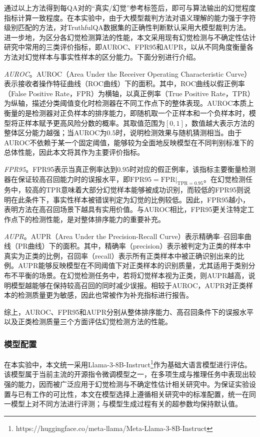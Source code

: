 通过以上方法得到每QA对的“真实/幻觉”参考标签后，即可与算法输出的幻觉程度指标计算一致程度。在本实验中，由于大模型裁判方法对语义理解的能力强于字符级别匹配的方法，对TruthfulQA数据集的正确性判断默认采用大模型裁判方法。进一步地，为区分各幻觉检测算法的性能，本文采用现有幻觉检测与不确定性估计研究中常用的三类评价指标，即AUROC、FPR95和AUPR，以从不同角度衡量各方法对幻觉样本与事实性样本的区分能力。下面分别进行介绍。

\emph{AUROC}。AUROC（Area Under the Receiver Operating Characteristic Curve）表示接收者操作特征曲线（ROC曲线）下的面积。其中，ROC曲线以假正例率（False Positive Rate，FPR）为横轴，以真正例率（True Positive Rate，TPR）为纵轴，描述分类阈值变化时检测器在不同工作点下的整体表现。AUROC本质上衡量的是检测器对正负样本的排序能力，即随机取一个正样本和一个负样本时，模型将正样本赋予更高风险分数的概率。其取值范围为$[0,1]$，数值越大表示方法的整体区分能力越强；当AUROC为$0.5$时，说明检测效果与随机猜测相当。由于AUROC不依赖于某一个固定阈值，能够较为全面地反映模型在不同判别标准下的总体性能，因此本文将其作为主要评价指标。

\emph{FPR95}。FPR95表示当真正例率达到$0.95$时对应的假正例率，该指标主要衡量检测器在保证较高召回能力时的误报水平，即$\mathrm{FPR95} = \mathrm{FPR}\big|_{\mathrm{TPR}=0.95}$。在幻觉检测任务中，较高的TPR意味着大部分幻觉样本能够被成功识别，而较低的FPR95则说明在此条件下，事实性样本被错误判定为幻觉的比例较低。因此，FPR95越小，表明方法在高召回场景下越具有实用价值。与AUROC相比，FPR95更关注特定工作点下的检测性能，是对整体排序能力的重要补充。

\emph{AUPR}。AUPR（Area Under the Precision-Recall Curve）表示精确率--召回率曲线（PR曲线）下的面积。其中，精确率（precision）表示被判定为正类的样本中真实为正类的比例，召回率（recall）表示所有正类样本中被正确识别出来的比例。AUPR能够反映模型在不同阈值下对正类样本的识别质量，尤其适用于类别分布不平衡的场景。在幻觉检测任务中，若将幻觉样本视为正类，则AUPR越高，说明模型越能够在保持较高召回的同时减少误报。相较于AUROC，AUPR对正类样本的检测质量更为敏感，因此也常被作为补充指标进行报告。

综上，AUROC、FPR95和AUPR分别从整体排序能力、高召回条件下的误报水平以及正类检测质量三个方面评估幻觉检测方法的性能。

\subsubsection{模型配置}

在本实验中，本文统一采用Llama-3-8B-Instruct\footnote{https://huggingface.co/meta-llama/Meta-Llama-3-8B-Instruct\cite{grattafiori2024llama}}作为基础大语言模型进行评估。该模型属于当前主流的开源指令微调模型之一，在多项生成与推理任务中表现出较强的能力，因而被广泛应用于幻觉检测与不确定性估计相关研究中。为保证实验设置与已有工作的可比性，本文在模型选择上遵循相关研究中的标准配置，统一在同一模型上对不同方法进行评测；与模型生成过程有关的超参数均保持默认值。

